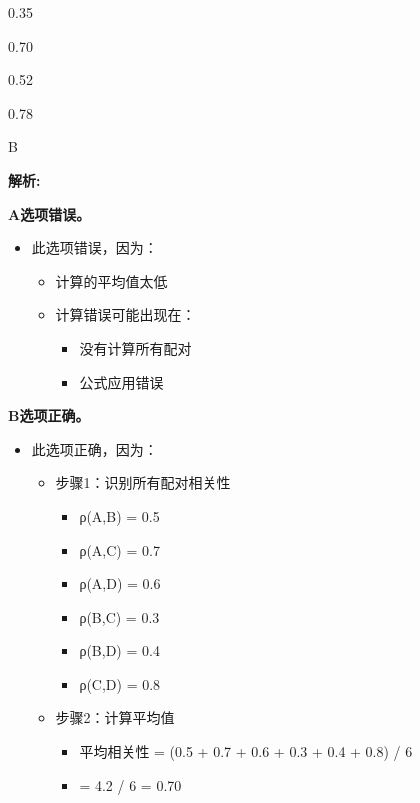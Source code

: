 \documentclass{article}
\newenvironment{explanation}
{\textbf{解析:}\par}
{\par}
\begin{document}
\begin{choices}
    \item 0.35
    \item 0.70
    \item 0.52
    \item 0.78
\end{choices}

\begin{correctanswer}
    B
\end{correctanswer}

\begin{explanation}
    \textbf{A选项错误。}
    \begin{itemize}
        \item 此选项错误，因为：
        \begin{itemize}
            \item 计算的平均值太低
            \item 计算错误可能出现在：
            \begin{itemize}
                \item 没有计算所有配对
                \item 公式应用错误
            \end{itemize}
        \end{itemize}
    \end{itemize}
    \textbf{B选项正确。}
    \begin{itemize}
        \item 此选项正确，因为：
        \begin{itemize}
            \item 步骤1：识别所有配对相关性
            \begin{itemize}
                \item ρ(A,B) = 0.5
                \item ρ(A,C) = 0.7
                \item ρ(A,D) = 0.6
                \item ρ(B,C) = 0.3
                \item ρ(B,D) = 0.4
                \item ρ(C,D) = 0.8
            \end{itemize}
            \item 步骤2：计算平均值
            \begin{itemize}
                \item 平均相关性 = (0.5 + 0.7 + 0.6 + 0.3 + 0.4 + 0.8) / 6
                \item = 4.2 / 6 = 0.70

\end{itemize}
\end{itemize}
\end{itemize}
\end{explanation}
\end{document}
